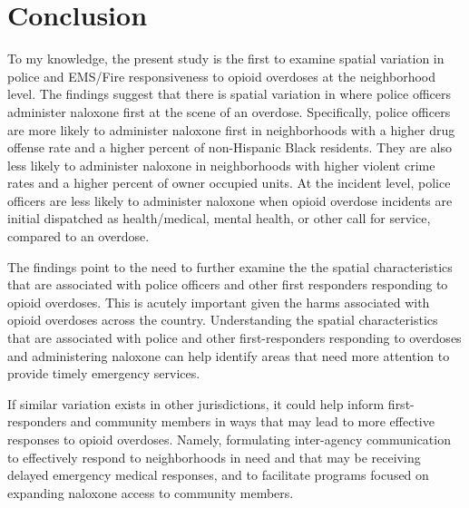 \section{\centering Conclusion}

To my knowledge, the present study is the first to examine spatial variation in police and EMS/Fire responsiveness to opioid overdoses at the neighborhood level. The findings suggest that there is spatial variation in where police officers administer naloxone first at the scene of an overdose. Specifically, police officers are more likely to administer naloxone first in neighborhoods with a higher drug offense rate and a higher percent of non-Hispanic Black residents. They are also less likely to administer naloxone in neighborhoods with higher violent crime rates and a higher percent of owner occupied units. At the incident level, police officers are less likely to administer naloxone when opioid overdose incidents are initial dispatched as health/medical, mental health, or other call for service, compared to an overdose. 

The findings point to the need to further examine the the spatial characteristics that are associated with police officers and other first responders responding to opioid overdoses. This is acutely important given the harms associated with opioid overdoses across the country. Understanding the spatial characteristics that are associated with police and other first-responders responding to overdoses and administering naloxone can help identify areas that need more attention to provide timely emergency services.

If similar variation exists in other jurisdictions, it could help inform first-responders and community members in ways that may lead to more effective responses to opioid overdoses. Namely, formulating inter-agency communication to effectively respond to neighborhoods in need and that may be receiving delayed emergency medical responses, and to facilitate programs focused on expanding naloxone access to community members. 

\newpage





